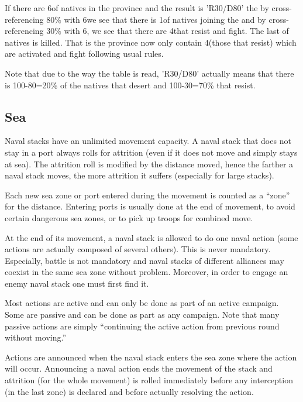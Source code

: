 \begin{exemple}
  If there are 6\LD of natives in the province and the result is 'R30/D80' the
  by cross-referencing 80\% with 6\LD we see that there is 1\LD of natives
  joining the \LeaderC and by cross-referencing 30\% with 6\LD, we see that
  there are 4\LD that resist and fight. The last \LD of natives is
  killed. That is the province now only contain 4\LD (those that resist) which
  are activated and fight following usual rules.

  Note that due to the way the table is read, 'R30/D80' actually means that
  there is 100-80=20\% of the natives that desert and 100-30=70\% that resist.
\end{exemple}

\subsection{Sea}
Naval stacks have an unlimited movement capacity. A naval stack that does not
stay in a port always rolls for attrition (even if it does not move and simply
stays at sea). The attrition roll is modified by the distance moved, hence the
farther a naval stack moves, the more attrition it suffers (especially for
large stacks).

Each new sea zone or port entered during the movement is counted as a ``zone''
for the distance. Entering ports is usually done at the end of movement, to
avoid certain dangerous sea zones, or to pick up troops for combined move.

At the end of its movement, a naval stack is allowed to do one naval action
(some actions are actually composed of several others). This is never
mandatory. Especially, battle is not mandatory and naval stacks of different
alliances may coexist in the same sea zone without problem. Moreover, in order
to engage an enemy naval stack one must first find it.

Most actions are active and can only be done as part of an active
campaign. Some are passive and can be done as part as any campaign. Note that
many passive actions are simply ``continuing the active action from previous
round without moving.''

Actions are announced when the naval stack enters the sea zone where the
action will occur. Announcing a naval action ends the movement of the stack
and attrition (for the whole movement) is rolled immediately before any
interception (in the last zone) is declared and before actually resolving the
action.

